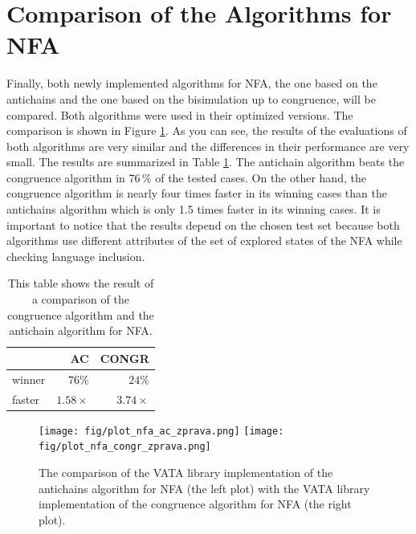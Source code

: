\section{Comparison of the Algorithms for NFA}
Finally, both newly implemented algorithms for NFA, the one based on the antichains and the one based on the bisimulation up to congruence, will be compared.
Both algorithms were used in their optimized versions.
The comparison is shown in Figure \ref{fig:figPlotNFA}.
As you can see, the results of the evaluations of both algorithms are very similar and the differences in their performance are very small. 
The results are summarized in Table \ref{tabNFA}. The antichain algorithm beats the congruence algorithm in 76\,\% of
the tested cases. On the other hand, the congruence algorithm is nearly four times faster in its winning cases than the antichains algorithm which is
only 1.5 times faster in its winning cases. 
It is important to notice that the results depend on the chosen test set because both algorithms use different attributes
of the set of explored states of the NFA while checking language inclusion.
\begin{table}[bt]
\begin{center}
\parbox{.45\linewidth}{
  \begin{tabular}[scale=0.3]{ | l | r | r |}
   \hline
    & \textbf{AC} & \textbf{CONGR} \\ \hline \hline
    winner & $76\%$ & $24\%$ \\ \hline
    faster & $1.58\times$ & $3.74\times$ \\ \hline
   \end{tabular}
}
   \caption{This table shows the result of a comparison of the congruence algorithm and the antichain algorithm for NFA.}
   \label{tabNFA}
\end{center}
\end{table}

\begin{figure}[h]
\begin{center}
\texttt{[image: fig/plot\_nfa\_ac\_zprava.png]}
\texttt{[image: fig/plot\_nfa\_congr\_zprava.png]}
\caption{The comparison of the VATA library implementation of the antichains algorithm for NFA (the left plot)
    with the VATA library implementation of the congruence algorithm for NFA (the right plot).}
\label{fig:figPlotNFA}
\end{center}
\end{figure}
\hfill

